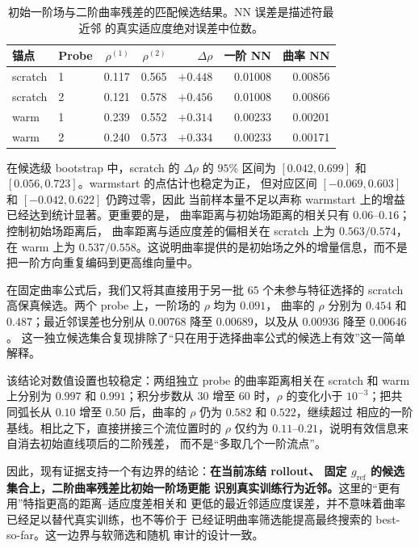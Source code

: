 \documentclass[UTF8,11pt]{ctexart}
\begin{document}
\begin{table}[t]
\centering
\small
\caption{初始一阶场与二阶曲率残差的匹配候选结果。NN 误差是描述符最近邻
的真实适应度绝对误差中位数。}
\label{tab:second-order-evidence}
\begin{tabular}{llrrrrr}
\toprule
锚点 & Probe & \(\rho^{(1)}\) & \(\rho^{(2)}\) &
\(\Delta\rho\) & 一阶 NN & 曲率 NN\\
\midrule
scratch & 1 & 0.117 & 0.565 & \(+0.448\) & 0.01008 & 0.00856\\
scratch & 2 & 0.121 & 0.578 & \(+0.456\) & 0.01008 & 0.00866\\
warm    & 1 & 0.239 & 0.552 & \(+0.314\) & 0.00233 & 0.00201\\
warm    & 2 & 0.240 & 0.573 & \(+0.334\) & 0.00233 & 0.00171\\
\bottomrule
\end{tabular}
\end{table}

在候选级 bootstrap 中，scratch 的 \(\Delta\rho\) 的 \(95\%\) 区间为
\([0.042,0.699]\) 和 \([0.056,0.723]\)。warmstart 的点估计也稳定为正，
但对应区间 \([-0.069,0.603]\) 和 \([-0.042,0.622]\) 仍跨过零，因此
当前样本量不足以声称 warmstart 上的增益已经达到统计显著。更重要的是，
曲率距离与初始场距离的相关只有 \(0.06\)--\(0.16\)；控制初始场距离后，
曲率距离与适应度差的偏相关在 scratch 上为 \(0.563/0.574\)，在 warm
上为 \(0.537/0.558\)。这说明曲率提供的是初始场之外的增量信息，而不是
把一阶方向重复编码到更高维向量中。

在固定曲率公式后，我们又将其直接用于另一批 \(65\) 个未参与特征选择的
scratch 高保真候选。两个 probe 上，一阶场的 \(\rho\) 均为 \(0.091\)，
曲率的 \(\rho\) 分别为 \(0.454\) 和 \(0.487\)；最近邻误差也分别从
\(0.00768\) 降至 \(0.00689\)，以及从 \(0.00936\) 降至 \(0.00646\)。
这一独立候选集合复现排除了“只在用于选择曲率公式的候选上有效”这一简单
解释。

该结论对数值设置也较稳定：两组独立 probe 的曲率距离相关在 scratch 和
warm 上分别为 \(0.997\) 和 \(0.991\)；积分步数从 \(30\) 增至 \(60\)
时，\(\rho\) 的变化小于 \(10^{-3}\)；把共同弧长从 \(0.10\) 增至
\(0.50\) 后，曲率的 \(\rho\) 仍为 \(0.582\) 和 \(0.522\)，继续超过
相应的一阶基线。相比之下，直接拼接三个流位置时的 \(\rho\) 仅约为
\(0.11\)--\(0.21\)，说明有效信息来自消去初始直线项后的二阶残差，
而不是“多取几个一阶流点”。

因此，现有证据支持一个有边界的结论：\textbf{在当前冻结 rollout、
固定 \(g_{\mathrm{ref}}\) 的候选集合上，二阶曲率残差比初始一阶场更能
识别真实训练行为近邻。}这里的“更有用”特指更高的距离--适应度差相关和
更低的最近邻适应度误差，并不意味着曲率已经足以替代真实训练，也不等价于
已经证明曲率筛选能提高最终搜索的 best-so-far。这一边界与软筛选和随机
审计的设计一致。
\end{document}
